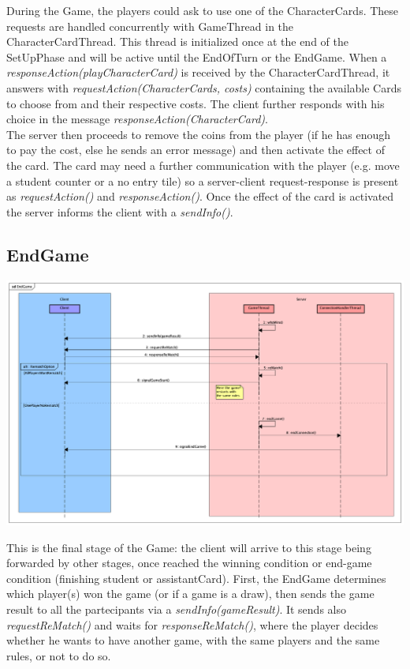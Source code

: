 \documentclass[12pt]{article}
\begin{document}
			During the Game, the players could ask to use one of the CharacterCards. These requests are handled concurrently with GameThread in the CharacterCardThread. This thread is initialized once at the end of the SetUpPhase and will be active until the EndOfTurn or the EndGame. When a \emph{responseAction(playCharacterCard)} is received by the CharacterCardThread, it answers with \emph{requestAction(CharacterCards, costs)} containing the available Cards to choose from and their respective costs. The client further responds with his choice in the message \emph{responseAction(CharacterCard)}. \\
			The server then proceeds to remove the coins from the player (if he has enough to pay the cost, else he sends an error message) and then activate the effect of the card. The card may need a further communication with the player (e.g. move a student counter or a no entry tile) so a server-client request-response is present as \emph{requestAction()} and \emph{responseAction()}. Once the effect of the card is activated the server informs the client with a \emph{sendInfo()}.
			
		\subsection{EndGame}
			
			\begin{center}
				\includegraphics[width=\textwidth,height=\textheight,keepaspectratio]{EndGame}
			\end{center}	
			
			This is the final stage of the Game: the client will arrive to this stage being forwarded by other stages, once reached the winning condition or end-game condition (finishing student or assistantCard). First, the EndGame determines which player(s) won the game (or if a game is a draw), then sends the game result to all the partecipants via a \emph{sendInfo(gameResult)}. It sends also \emph{requestReMatch()} and waits for \emph{responseReMatch()}, where the player decides whether he wants to have another game, with the same players and the same rules, or not to do so.
			
\end{document}
